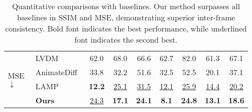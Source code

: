 \begin{table}[]
{{\begin{threeparttable}
\begin{tabular}{@{}l@{\hskip 4pt}l@{\hskip 2pt}c@{\hskip 2pt}c@{\hskip 2pt}c@{\hskip 2pt}c@{\hskip 3pt}c@{\hskip 3pt}c@{\hskip 3pt}c@{}}
                \multirow{4}{*}{MSE $\mathrel{\downarrow}$} 
                & LVDM~\cite{he2022latent}     & 62.0          & 68.0          & 66.6            & 62.7          & 82.0          & 61.3          & 67.1          \\
                & AnimateDiff~\cite{guo2023animatediff}     & 33.8          & 32.2          & 51.6          & 32.5          & 52.5          & 20.1          & 37.1          \\
                & LAMP~\cite{wu2023lamp}    & \textbf{12.2}          & \underline{25.1}            & \underline{31.5}          & \underline{12.1}          & \underline{25.9}          & \underline{14.4}            & \underline{20.2}          \\
                & \textbf{Ours} & \underline{24.3} & \textbf{17.1} & \textbf{24.1} & \textbf{8.1} & \textbf{24.8} &  \textbf{13.1} & \textbf{18.6} \\

            \bottomrule
        \end{tabular}
        
        \end{threeparttable}
        }
    }
\caption{Quantitative comparisons with baselines. Our method surpasses all baselines in SSIM and MSE, demonstrating superior inter-frame consistency. Bold font indicates the best performance, while underlined font indicates the second best.}
\label{tab:4}
\end{table}


\begin{table}
  \centering
  \setlength{\extrarowheight}{1pt}
  \caption{User preference comparison. This table demonstrates our significant superiority in aspects such as Aesthetics, Consistency, and Alignment, in comparison to LVDM~\cite{he2022latent}, AnimateDiff~\cite{guo2023animatediff}, and LAMP~\cite{wu2023lamp}. Bold font indicates the best performance, while underlined font indicates the second best.}
  \label{tab:example2}
\end{table}


